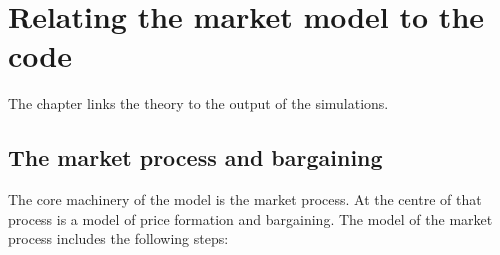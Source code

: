 \chapter{Relating the market model to the code}

The chapter links the theory to the output of the simulations. %

\section{The market process and bargaining}
The core machinery of the model is the market process. At the centre of that process is a model of price formation and bargaining. %
The model of the market process includes the following steps:

